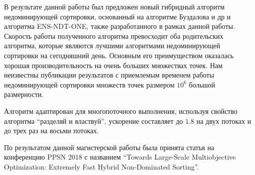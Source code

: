 \startconclusionpage

В результате данной работы был предложен новый гибридный алгоритм недоминирующей сортировки, основанный на алгоритме Буздалова и др и алгоритма ENS-NDT-ONE, также разработанного в рамках данной работы. Скорость работы полученного алгоритма превосходит оба родительских алгоритма, которые являются лучшими алгоритмами недоминирующей сортировки на сегодняшний день. Основным его преимуществом оказалась хорошая производительность на очень больших множествах точек. Нам неизвестны публикации результатов с приемлемым временем работы недоминирующей сортировки множеств точек размером $10^6$ большой размерности.

Алгоритм адаптирован для многопоточного выполнения, используя свойство алгоритма ``разделяй и властвуй'', ускорение составляет до $1.8$ на двух потоках и до трех раз на восьми потоках.

По результатом данной магистерской работы была принята статья на конференцию PPSN 2018 с названием ``Towards Large-Scale Multiobjective Optimization: Extremely Fast Hybrid Non-Dominated Sorting''. 
